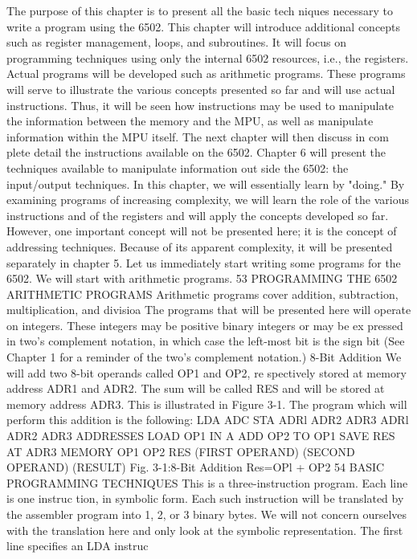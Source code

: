 The purpose of this chapter is to present all the basic tech
niques necessary to write a program using the 6502. This chapter
will introduce additional concepts such as register management,
loops, and subroutines. It will focus on programming techniques
using only the internal 6502 resources, i.e., the registers. Actual
programs will be developed such as arithmetic programs. These
programs will serve to illustrate the various concepts presented
so far and will use actual instructions. Thus, it will be seen how
instructions may be used to manipulate the information between
the memory and the MPU, as well as manipulate information
within the MPU itself. The next chapter will then discuss in com
plete detail the instructions available on the 6502. Chapter 6 will
present the techniques available to manipulate information out
side the 6502: the input/output techniques.
In this chapter, we will essentially learn by "doing." By examining
programs of increasing complexity, we will learn the role of the
various instructions and of the registers and will apply the concepts
developed so far. However, one important concept will not be
presented here; it is the concept of addressing techniques. Because of
its apparent complexity, it will be presented separately in chapter 5.
Let us immediately start writing some programs for the 6502.
We will start with arithmetic programs.
53
PROGRAMMING THE 6502
ARITHMETIC PROGRAMS
Arithmetic programs cover addition, subtraction, multiplication,
and divisioa The programs that will be presented here will operate on
integers. These integers may be positive binary integers or may be ex
pressed in two's complement notation, in which case the left-most bit
is the sign bit (See Chapter 1 for a reminder of the two's complement
notation.)
8-Bit Addition
We will add two 8-bit operands called OP1 and OP2, re
spectively stored at memory address ADR1 and ADR2. The sum
will be called RES and will be stored at memory address ADR3.
This is illustrated in Figure 3-1. The program which will perform
this addition is the following:
LDA
ADC
STA
ADRl
ADR2
ADR3
ADRl
ADR2
ADR3
ADDRESSES
LOAD OP1 IN A
ADD OP2 TO OP1
SAVE RES AT ADR3
MEMORY
OP1
OP2
RES
(FIRST OPERAND)
(SECOND OPERAND)
(RESULT)
Fig. 3-1:8-Bit Addition Res=OPl + OP2
54
BASIC PROGRAMMING TECHNIQUES
This is a three-instruction program. Each line is one instruc
tion, in symbolic form. Each such instruction will be translated by
the assembler program into 1, 2, or 3 binary bytes. We will not
concern ourselves with the translation here and only look at the
symbolic representation. The first line specifies an LDA instruc
